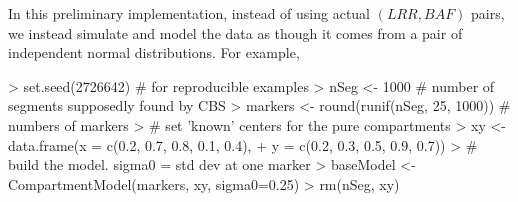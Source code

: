 \documentclass{article}
\begin{document}
In this preliminary implementation, instead of using actual
$(LRR,BAF)$ pairs, we instead simulate and model the data as though it
comes from a pair of independent normal distributions.  For example,
\begin{Schunk}
\begin{Sinput}
> set.seed(2726642) # for reproducible examples
> nSeg <-  1000     # number of segments supposedly found by CBS
> markers <- round(runif(nSeg, 25, 1000))  # numbers of markers
> # set 'known' centers for the pure compartments
> xy <- data.frame(x = c(0.2, 0.7, 0.8, 0.1, 0.4),
+                  y = c(0.2, 0.3, 0.5, 0.9, 0.7))
> # build the model. sigma0 = std dev at one marker
> baseModel <- CompartmentModel(markers, xy, sigma0=0.25)
> rm(nSeg, xy)
\end{Sinput}
\end{Schunk}
\end{document}
